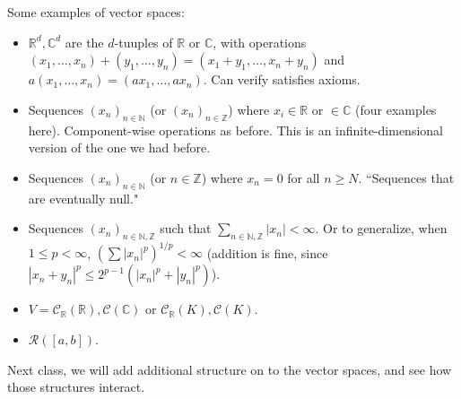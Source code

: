 \documentclass{article}
\theoremstyle{plain}
\theoremstyle{remark}
\newcommand{\N}{{\mathbb N}}
\newcommand{\Z}{{\mathbb Z}}
\newcommand{\R}{{\mathbb R}}
\newcommand{\C}{{\mathbb C}}
\begin{document}
Some examples of vector spaces:
\begin{itemize}
	\item $\R^d, \C^d$ are the $d$-tuuples of $\R$ or $\C$,
		with operations $(x_1,\dots,x_n) + (y_1,\dots,y_n) = (x_1+y_1,\dots,x_n+y_n)$
		and $a(x_1,\dots,x_n) = (ax_1,\dots,ax_n)$.
		Can verify satisfies axioms.
	\item Sequences $(x_n)_{n\in\N}$ (or $(x_n)_{n \in \Z}$)
		where $x_i \in \R$ or $\in \C$ (four examples here).
		Component-wise operations as before.
		This is an infinite-dimensional version of the one we had before.
	\item Sequences $(x_n)_{n\in\N}$ (or $n \in \Z$) where
		$x_n = 0$ for all $n \geq N$.
		``Sequences that are eventually null."
	\item Sequences $(x_n)_{n\in \N,\Z}$ such that $\sum_{n \in \N,\Z} |x_n| < \infty$.
		Or to generalize, when $1 \leq p < \infty$,
		$\left(\sum |x_n|^p \right)^{1/p} < \infty$
		(addition is fine, since $|x_n + y_n|^p \leq 2^{p-1}\left(|x_n|^p + |y_n|^p\right)$).
	\item $V = \mathcal{C}_\R(\R), \mathcal{C}(\C)$ or $\mathcal{C}_\R(K),\mathcal{C}(K)$.
	\item $\mathcal{R}([a,b])$.
\end{itemize}
Next class, we will add additional structure on to the vector spaces,
and see how those structures interact.
\end{document}
